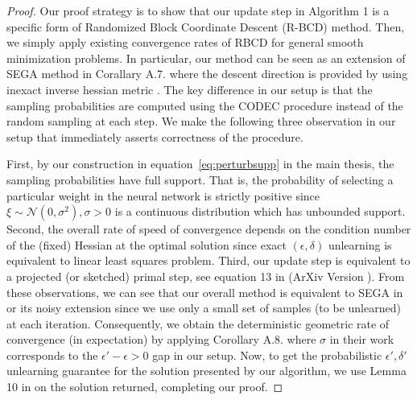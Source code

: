\begin{proof}
Our proof strategy is to show that our update step in Algorithm 1 is a specific form of Randomized Block Coordinate Descent (R-BCD) method. Then, we simply apply existing convergence rates of RBCD for general smooth minimization problems.  In particular, our method can be seen as an extension of SEGA method in Corallary A.7. \cite{gorbunov2020unified} where the descent direction is provided by using inexact inverse hessian metric \cite{loizou2020convergence}.  The key difference in our setup is that the sampling probabilities are computed using the CODEC procedure instead of the random sampling at each step. We make the following three observation in our setup  that immediately asserts correctness of the procedure. 

First, by our construction in equation~\eqref{eq:perturbsupp} in the main thesis, the sampling probabilities have full support. That is, the probability of selecting a particular weight in the neural network is strictly positive since $\xi\sim\mathcal{N}(0,\sigma^2), \sigma>0$ is a continuous distribution which has unbounded support. Second, the overall rate of speed of convergence depends on the condition number of the (fixed) Hessian at the optimal solution since exact $(\epsilon,\delta)$ unlearning is equivalent to linear least squares problem. Third, our update step is equivalent to a projected (or sketched) primal step, see equation 13 in (ArXiv Version \cite{loizou2019convergenceArxiv}). From these observations, we can see that our overall method is equivalent to SEGA in \cite{gorbunov2020unified} or its noisy extension since we use only a small set of samples (to be unlearned) at each iteration. Consequently, we obtain the deterministic geometric rate of convergence (in expectation)  by applying Corollary A.8. where $\sigma$ in their work corresponds to the $\epsilon'-\epsilon>0$ gap in our setup. Now, to get the probabilistic $\epsilon',\delta'$ unlearning guarantee for the solution presented by our algorithm, we use Lemma 10 in \cite{sekhari2021remember} on the solution returned, completing our proof.
\end{proof}
